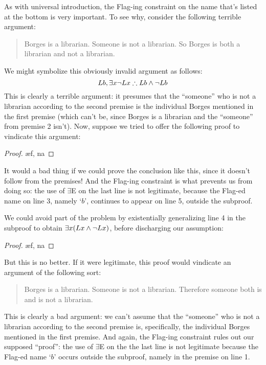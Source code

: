 As with universal introduction, the Flag-ing constraint on the name  that's listed at the bottom is very important. To see why, consider the following terrible argument:
	\begin{quote}
		Borges is a librarian. Someone is not a librarian. So Borges is both a librarian and not a librarian. 	\end{quote}
We might symbolize this obviously invalid argument as follows:
$$Lb, \exists x \neg Lx \therefore Lb \wedge \neg Lb$$
This is clearly a terrible argument: it presumes that the ``someone'' who is not a librarian according to the second premise is the individual Borges mentioned in the first premise (which can't be, since Borges is a librarian and the ``someone'' from premise 2 isn't).  Now, suppose we tried to offer the following proof to vindicate this argument:
\begin{proof}
	\open	
		 
		\ae{f, na}
	\close
\end{proof}
It would a bad thing if we could prove the conclusion like this, since it doesn't follow from the premises!  And the Flag-ing constraint is what prevents us from doing so:  the use of $\exists$E on the last line is not legitimate, because the Flag-ed name on line 3, namely `$b$', continues to appear on line 5, outside the subproof. 


We could avoid part of the problem by existentially generalizing line 4 in the subproof to obtain $\exists x(Lx \wedge \lnot Lx)$, before discharging our assumption:
\begin{proof}
	\open	
		 
		\ae{f, na}
	\close
\end{proof}
But this is no better.  If it were legitimate, this proof would vindicate an argument of the following sort:
\begin{quote}
Borges is a librarian. Someone is not a librarian.  Therefore someone both is and is not a librarian.	\end{quote}
This is clearly a bad argument: we can't assume that the ``someone'' who is not a librarian according to the second premise is, specifically, the individual Borges mentioned in the first premise.  And again, the Flag-ing constraint rules out our supposed ``proof'': the use of $\exists$E on the the last line is not legitimate because the Flag-ed name `$b$' occurs outside the subproof, namely in the premise on line 1. 

